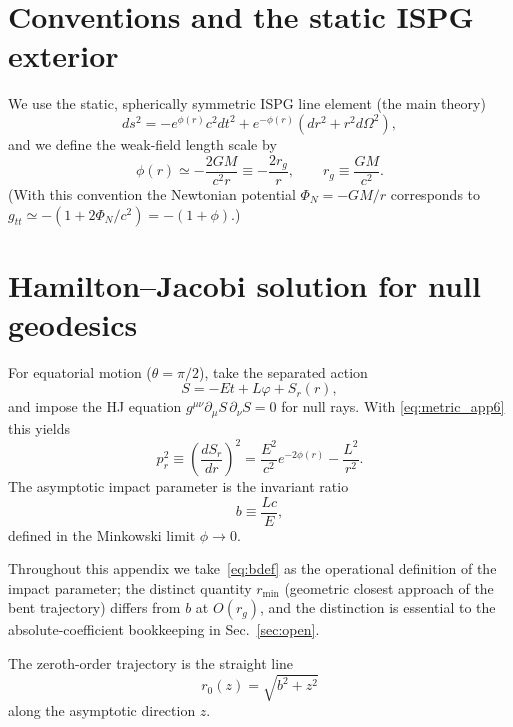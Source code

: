 \documentclass[11pt]{article}
\begin{document}
\section{Conventions and the static ISPG exterior}
We use the static, spherically symmetric ISPG line element (the main theory)
\begin{equation}
ds^2=-e^{\phi(r)}c^2dt^2+e^{-\phi(r)}\left(dr^2+r^2d\Omega^2\right),
\label{eq:metric_app6}
\end{equation}
and we define the weak-field length scale by
\begin{equation}
\phi(r)\simeq -\frac{2GM}{c^2 r}\equiv -\frac{2r_g}{r},
\qquad r_g\equiv \frac{GM}{c^2}.
\label{eq:phi}
\end{equation}
(With this convention the Newtonian potential $\Phi_N=-GM/r$ corresponds to $g_{tt}\simeq -(1+2\Phi_N/c^2)=-(1+\phi)$.)

\section{Hamilton--Jacobi solution for null geodesics}
For equatorial motion ($\theta=\pi/2$), take the separated action
\begin{equation}
S=-Et+L\varphi+S_r(r),
\end{equation}
and impose the HJ equation $g^{\mu\nu}\partial_\mu S\,\partial_\nu S=0$ for null rays. With \eqref{eq:metric_app6} this yields
\begin{equation}
p_r^2\equiv \left(\frac{dS_r}{dr}\right)^2=\frac{E^2}{c^2}e^{-2\phi(r)}-\frac{L^2}{r^2}.
\label{eq:pr2}
\end{equation}
The asymptotic impact parameter is the invariant ratio
\begin{equation}
b\equiv \frac{Lc}{E},
\label{eq:bdef}
\end{equation}
defined in the Minkowski limit $\phi\to 0$.

Throughout this appendix we take~\eqref{eq:bdef} as the operational
definition of the impact parameter; the distinct quantity
$r_{\min}$ (geometric closest approach of the bent trajectory)
differs from $b$ at $O(r_g)$, and the distinction is essential
to the absolute-coefficient bookkeeping in Sec.~\ref{sec:open}.

The zeroth-order trajectory is the straight line
\begin{equation}
r_0(z)=\sqrt{b^2+z^2}
\label{eq:r0_app6}
\end{equation}
along the asymptotic direction $z$.
\end{document}
